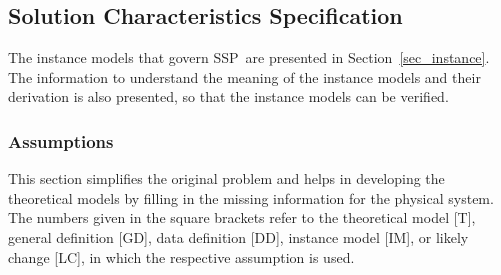 \documentclass[12pt]{article}
\newcommand{\progname}{SSP}
\begin{document}
\subsection{Solution Characteristics Specification}

The instance models that govern \progname\ are presented in
Section~\ref{sec_instance}.  The information to understand the
meaning of the instance models and their derivation is also presented,
so that the instance models can be verified.

\subsubsection{Assumptions}
\label{Assumptions}
This section simplifies the original problem and helps in developing the
theoretical models by filling in the missing information for the physical
system. The numbers given in the square brackets refer to the theoretical model
[T], general definition [GD], data definition [DD], instance model [IM], or
likely change [LC], in which the respective assumption is used.
\end{document}
